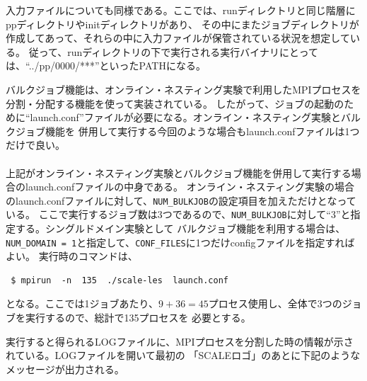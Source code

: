 入力ファイルについても同様である。ここでは、runディレクトリと同じ階層にppディレクトリやinitディレクトリがあり、
その中にまたジョブディレクトリが作成してあって、それらの中に入力ファイルが保管されている状況を想定している。
従って、runディレクトリの下で実行される実行バイナリにとっては、``../pp/0000/***''といったPATHになる。

バルクジョブ機能は、オンライン・ネスティング実験で利用したMPIプロセスを分割・分配する機能を使って実装されている。
したがって、ジョブの起動のために``launch.conf''ファイルが必要になる。オンライン・ネスティング実験とバルクジョブ機能を
併用して実行する今回のような場合もlaunch.confファイルは1つだけで良い。\\

\\

\noindent 上記がオンライン・ネスティング実験とバルクジョブ機能を併用して実行する場合のlaunch.confファイルの中身である。
オンライン・ネスティング実験の場合のlaunch.confファイルに対して、\verb|NUM_BULKJOB|の設定項目を加えただけとなっている。
ここで実行するジョブ数は3つであるので、\verb|NUM_BULKJOB|に対して``3''と指定する。シングルドメイン実験として
バルクジョブ機能を利用する場合は、\verb|NUM_DOMAIN = 1|と指定して、\verb|CONF_FILES|に1つだけconfigファイルを指定すればよい。
実行時のコマンドは、 

\begin{verbatim}
 $ mpirun  -n  135  ./scale-les  launch.conf
\end{verbatim}

となる。ここでは1ジョブあたり、$9 + 36 = 45$プロセス使用し、全体で3つのジョブを実行するので、総計で135プロセスを
必要とする。

実行すると得られるLOGファイルに、MPIプロセスを分割した時の情報が示されている。LOGファイルを開いて最初の
「SCALEロゴ」のあとに下記のようなメッセージが出力される。\\

